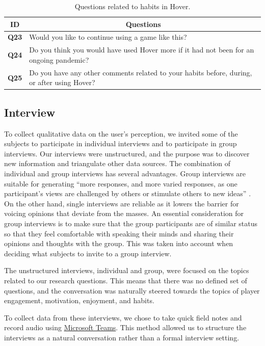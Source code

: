 \begin{table}[H]
    \centering
    \begin{tabularx}{0.95\textwidth}{|c|X|}
        \hline
        \textbf{ID} & \multicolumn{1}{c|}{\textbf{Questions}} \\ \hline
        \textbf{Q23} & Would you like to continue using a game like this?  \\
        \textbf{Q24} & Do you think you would have used Hover more if it had not been for an ongoing pandemic? \\
        \textbf{Q25} & Do you have any other comments related to your habits before, during, or after using Hover? \\ \hline
    \end{tabularx}
    \caption{Questions related to habits in Hover.}
    \label{tab:player_habits_questions}
\end{table}

\subsection{Interview}
To collect qualitative data on the user’s perception, we invited some of the subjects to participate in individual interviews and to participate in group interviews. Our interviews were unstructured, and the purpose was to discover new information and triangulate other data sources. The combination of individual and group interviews has several advantages. Group interviews are suitable for generating “more responses, and more varied responses, as one participant’s views are challenged by others or stimulate others to new ideas” \citep{oates_researching_2006}. On the other hand, single interviews are reliable as it lowers the barrier for voicing opinions that deviate from the masses. An essential consideration for group interviews is to make sure that the group participants are of similar status so that they feel comfortable with speaking their minds and sharing their opinions and thoughts with the group. This was taken into account when deciding what subjects to invite to a group interview.

The unstructured interviews, individual and group, were focused on the topics related to our research questions. This means that there was no defined set of questions, and the conversation was naturally steered towards the topics of player engagement, motivation, enjoyment, and habits.

To collect data from these interviews, we chose to take quick field notes and record audio using \href{https://www.microsoft.com/en-ww/microsoft-teams/group-chat-software}{Microsoft Teams}. This method allowed us to structure the interviews as a natural conversation rather than a formal interview setting.

